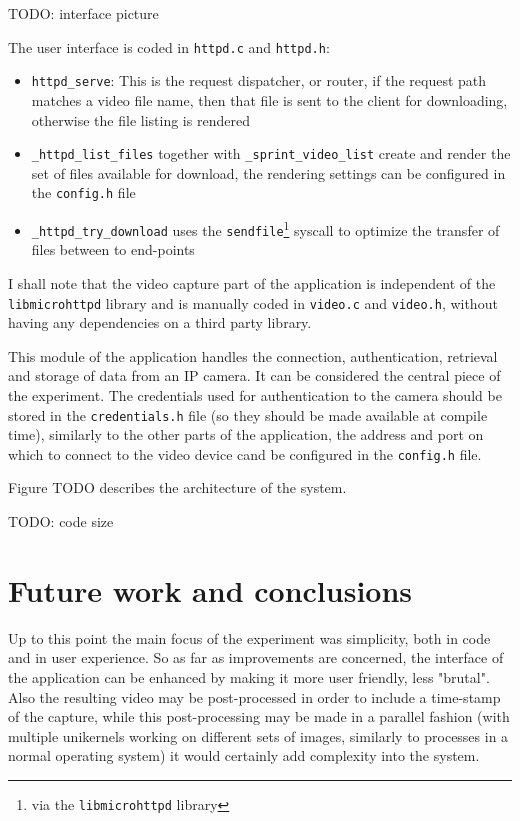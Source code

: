 \documentclass[10pt,a4paper,twoside]{article}
\begin{document}
TODO: interface picture

The user interface is coded in \texttt{httpd.c} and \texttt{httpd.h}:

\begin{itemize}
\item \texttt{httpd\_serve}: This is the request dispatcher, or router, if the request path matches a video file name,
then that file is sent to the client for downloading, otherwise the file listing is rendered
\item \texttt{\_httpd\_list\_files} together with \texttt{\_sprint\_video\_list} create and render the set of files available for download, the rendering settings can be configured in the \texttt{config.h} file
\item \texttt{\_httpd\_try\_download} uses the \texttt{sendfile}\footnote{via the \texttt{libmicrohttpd} library} syscall to optimize the transfer of files between to end-points
\end{itemize}

I shall note that the video capture part of the application is independent of the \texttt{libmicrohttpd} library and is manually coded in \texttt{video.c} and \texttt{video.h}, without having any dependencies on a third party library.

This module of the application handles the connection, authentication, retrieval and storage of data from an IP camera. It can be considered the central piece of the experiment. The credentials used for authentication to the camera should be stored in the \texttt{credentials.h} file (so they should be made available at compile time), similarly to the other parts of the application, the address and port on which to connect to the video device cand be configured in the \texttt{config.h} file.

Figure TODO describes the architecture of the system.

TODO: code size

\section{Future work and conclusions}

Up to this point the main focus of the experiment was simplicity, both in code and in user experience. So as far as improvements are concerned, the interface of the application can be enhanced by making it more user friendly, less "brutal". Also the resulting video may be post-processed in order to include a time-stamp of the capture,
while this post-processing may be made in a parallel fashion (with multiple unikernels working on different sets of images, similarly to processes in a normal operating system) it would certainly add complexity
into the system.
\end{document}

